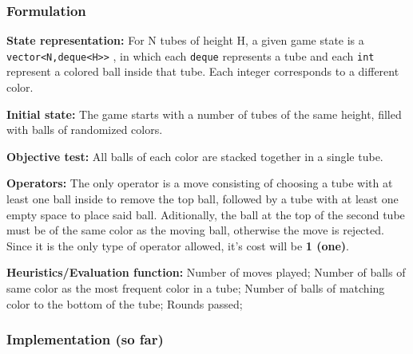 \documentclass{beamer}
\begin{document}
\begin{frame}[fragile=singleslide]
\frametitle{Formulation}

\textbf{State representation:} For N tubes of height H, a given game state is a 
\verb!vector<N,deque<H>>! , in which each \verb!deque! represents a tube and each \verb!int! represent a colored ball inside that tube. Each integer corresponds to a different color.

\textbf{Initial state:} The game starts with a number of tubes of the same height, filled with balls of randomized colors.

\textbf{Objective test:} All balls of each color are stacked together in a single tube.

\textbf{Operators:} The only operator is a move consisting of choosing a tube with at least one ball inside to remove the top ball, followed by a tube with at least one empty space to place said ball. Aditionally, the ball at the top of the second tube must be of the same color as the moving ball, otherwise the move is rejected. Since it is the only type of operator allowed, it's cost will be \textbf{1 (one)}.

\textbf{Heuristics/Evaluation function:} Number of moves played; Number of balls of same color as the most frequent color in a tube; Number of balls of matching color to the bottom of the tube; Rounds passed; 

\end{frame}

\begin{frame}
\frametitle{Implementation (so far)}

\end{frame}
\end{document}
